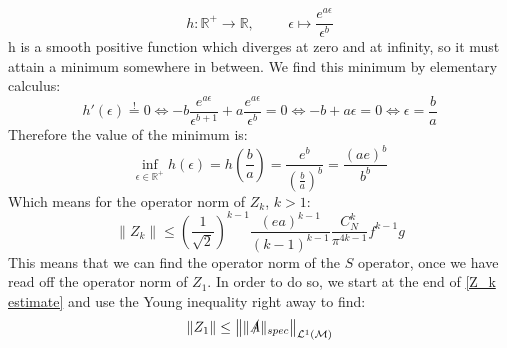 \documentclass[a4paper,12pt]{article}
\newcommand{\equaltext}[1]{\ensuremath{\stackrel{\text{#1}}{=}}}
\begin{document}
\begin{equation}
h: \mathbb{R}^+\rightarrow \mathbb{R},\hspace{1cm}\epsilon\mapsto\frac{e^{a \epsilon}}{\epsilon^b}
\end{equation}
h is a smooth positive function which diverges at zero and at infinity, so it must attain a minimum somewhere in between. We find this minimum by elementary calculus:
\begin{equation}
h'(\epsilon)\equaltext{!}0 \iff -b \frac{e^{a \epsilon}}{\epsilon^{b+1}}+ a \frac{e^{a \epsilon}}{\epsilon^b}=0 \iff -b +a \epsilon=0 \iff \epsilon= \frac{b}{a}
\end{equation}
Therefore the value of the minimum is:
\begin{equation}
\inf_{\epsilon\in\mathbb{R}^+} h(\epsilon)= h(\frac{b}{a})=\frac{e^b}{\left(\frac{b}{a}\right)^b}=\frac{(a e)^b}{b^b}
\end{equation}
Which means for the operator norm of \(Z_k\),  \(k>1\):
\begin{equation}
\|Z_k\|\le \left(\frac{1}{\sqrt{2} }\right)^{k-1} \frac{\left(e a\right)^{k-1}}{(k-1)^{k-1}} \frac{ C_N^k}{\pi^{4k-1}}  f^{k-1}  g
\end{equation}
This means that we can find the operator norm of the \(S\) operator, once we have read off the operator norm of \(Z_1\). In order to do so, we start at the end of  \eqref{Z_k estimate} and use the Young inequality right away to find:
\begin{equation}
\|Z_1\|\le \left\| \|\slashed{A}\|_{spec} \right\|_{\mathcal{L}^1(\mathcal{M})}
\end{equation}
\end{document}
